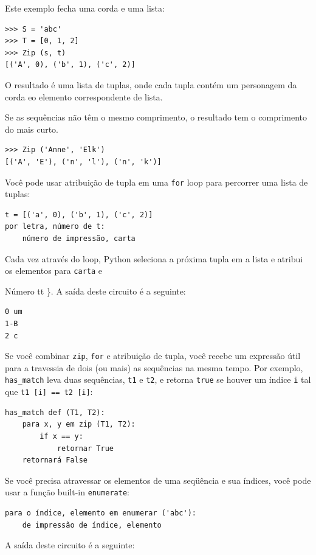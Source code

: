 \documentclass[10pt]{book}
\begin{document}
\begin{v erbatim}
Este exemplo fecha uma corda e uma lista:

\begin{verbatim}
>>> S = 'abc'
>>> T = [0, 1, 2]
>>> Zip (s, t)
[('A', 0), ('b', 1), ('c', 2)]
\end{verbatim}
%
O resultado é uma lista de tuplas, onde cada tupla contém
um personagem da corda eo elemento correspondente de
lista.

Se as sequências não têm o mesmo comprimento, o resultado tem o
comprimento do mais curto.

\begin{verbatim}
>>> Zip ('Anne', 'Elk')
[('A', 'E'), ('n', 'l'), ('n', 'k')]
\end{verbatim}
%
Você pode usar atribuição de tupla em uma {\tt for} loop para percorrer uma lista de
tuplas:

\begin{verbatim}
t = [('a', 0), ('b', 1), ('c', 2)]
por letra, número de t:
    número de impressão, carta
\end{verbatim}
%
Cada vez através do loop, Python seleciona a próxima tupla em
a lista e atribui os elementos para {\tt carta} e 
{Número tt \}. A saída deste circuito é a seguinte:

\begin{verbatim}
0 um
1-B
2 c
\end{verbatim}
%
Se você combinar {\tt zip}, {\tt for} e atribuição de tupla, você recebe um
expressão útil para a travessia de dois (ou mais) as sequências na mesma
tempo. Por exemplo, \verb "has_match" leva duas sequências, {\tt t1} e
{\tt t2}, e retorna {\tt true} se houver um índice {\tt i}
tal que {\tt t1 [i] == t2 [i]}:

\begin{verbatim}
has_match def (T1, T2):
    para x, y em zip (T1, T2):
        if x == y:
            retornar True
    retornará False
\end{verbatim}
%
Se você precisa atravessar os elementos de uma seqüência e sua
índices, você pode usar a função built-in {\tt enumerate}:

\begin{verbatim}
para o índice, elemento em enumerar ('abc'):
    de impressão de índice, elemento
\end{verbatim}
%
A saída deste circuito é a seguinte:

}
\end{v erbatim}
\end{document}
